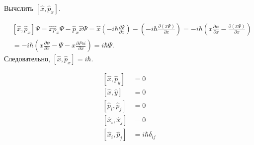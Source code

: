 \documentclass[a4paper,12pt]{article}
\begin{document}
\begin{problem}{}
Вычслить \(\left[\hat{x}, \hat{p}_x \right]\).

\begin{solution}
\[
\begin{split}
    & \left[\hat{x}, \hat{p}_x \right] \Psi
    = \hat{x} \hat{p}_x \Psi - \hat{p}_x \hat{x} \Psi
    = \hat{x} \left(-i\hbar \frac{\partial \Psi}{\partial x}\right) - \left(- i \hbar \frac{\partial \left(x \Psi\right)}{\partial x}\right)
    = -i \hbar \left(x \frac{\partial \psi}{\partial x} - \frac{\partial \left(x \Psi\right)}{\partial x} \right) \\
    &= -i \hbar \left(x \frac{\partial \psi}{\partial x} - \Psi - x \frac{\partial Psi}{\partial x}\right)
    = i \hbar \Psi.
\end{split}
\]
Следовательно, \(\left[\hat{x}, \hat{p}_x \right] = i \hbar\).
\end{solution}
\end{problem}

\begin{problem}{}
\begin{align*}
    \left[\hat{x}, \hat{p}_y \right] &= 0 \\
    \left[\hat{x}, \hat{y} \right] &= 0 \\
    \left[\hat{p}_i, \hat{p}_j \right] &= 0 \\
    \left[\hat{x}_i, \hat{x}_j \right] &= 0 \\
    \left[\hat{x}_i, \hat{p}_j \right] &= i\hbar \delta_{ij}
\end{align*}
\end{problem}
\end{document}
